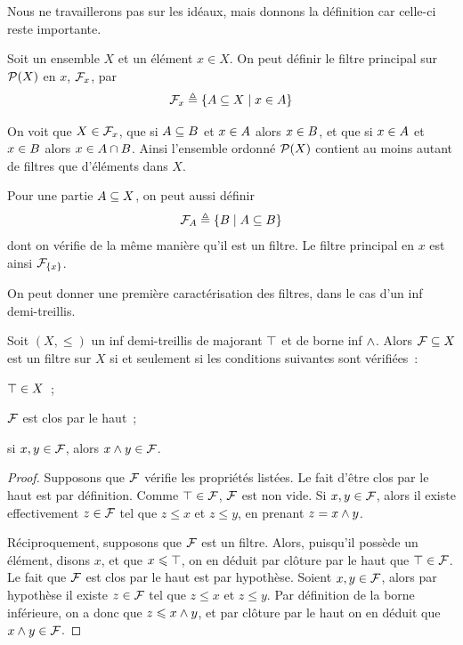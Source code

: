Nous ne travaillerons pas sur les idéaux, mais donnons la définition car
celle-ci reste importante.

\begin{example}
  Soit un ensemble $X$ et un élément $x\in X$. On peut définir le filtre
  principal sur $\mathcal{P}(X)$ en $x$, $\mathcal{F}_{x}$, par
  \[\mathcal{F}_{x} \triangleq \left\{ A\subseteq X \;\middle\vert\; x \in A \right\}\]

  On voit que $X\in \mathcal{F}_{x}$, que si $A\subseteq B$ et
  $x\in A$ alors $x\in B$, et que si $x\in A$ et $x\in B$
  alors $x\in A\cap B$. Ainsi l'ensemble ordonné $\mathcal{P}(X)$
  contient au moins autant de filtres que d'éléments dans $X$.

  Pour une partie $A \subseteq X$, on peut aussi définir
  \[\mathcal{F}_{A} \triangleq \left\{ B \;\middle\vert\; A\subseteq B \right\}\]
  dont on vérifie de la même manière qu'il est un filtre. Le filtre principal en
  $x$ est ainsi $\mathcal{F}_{\{x\}}$.
\end{example}

On peut donner une première caractérisation des filtres, dans le cas d'un
inf demi-treillis.

\begin{property}
  Soit $(X,\leq)$ un inf demi-treillis de majorant $\top$ et de borne inf
  $\wedge$. Alors $\mathcal{F}\subseteq X$ est un filtre sur $X$ si et seulement
  si les conditions suivantes sont vérifiées~:
  \begin{itemize}
    \begin{minipage}{0.2\textwidth}
    \item $\top \in X$~;
    \end{minipage}
    \begin{minipage}{0.35\textwidth}
    \item $\mathcal{F}$ est clos par le haut~;
    \end{minipage}
    \begin{minipage}{0.3\textwidth}
    \item si $x,y\in \mathcal{F}$, alors $x\wedge y\in \mathcal{F}$.
    \end{minipage}
  \end{itemize}
\end{property}

\begin{proof}
  Supposons que $\mathcal{F}$ vérifie les propriétés listées. Le fait d'être
  clos par le haut est par définition. Comme $\top\in\mathcal{F}$,
  $\mathcal{F}$ est non vide. Si $x,y\in\mathcal{F}$, alors il existe
  effectivement $z\in \mathcal{F}$ tel que $z\leq x$ et $z\leq y$, en prenant
  $z = x\wedge y$.

  Réciproquement, supposons que $\mathcal{F}$ est un filtre. Alors, puisqu'il
  possède un élément, disons $x$, et que $x\leqslant \top$, on en déduit par clôture
  par le haut que $\top\in\mathcal{F}$. Le fait que $\mathcal{F}$ est clos par le
  haut est par hypothèse. Soient $x,y\in \mathcal{F}$, alors par hypothèse il
  existe $z\in \mathcal{F}$ tel que $z\leq x$ et $z\leq y$. Par définition de la
  borne inférieure, on a donc que $z\leqslant x\wedge y$, et par clôture par le haut
  on en déduit que $x\wedge y \in \mathcal{F}$.
\end{proof}

